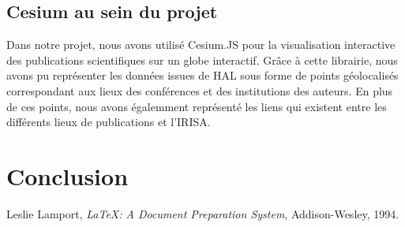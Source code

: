 \documentclass[a4paper,12pt]{article}
\begin{document}
\subsection{Cesium au sein du projet}
Dans notre projet, nous avons utilisé Cesium.JS pour la visualisation interactive des publications scientifiques sur un globe interactif. Grâce à cette librairie, nous avons pu représenter les données issues de HAL sous forme de points géolocalisés 
correspondant aux lieux des conférences et des institutions des auteurs. En plus de ces points, nous avons égalemment représenté les liens qui existent entre les différents lieux de publications et l'IRISA.


\section{Conclusion}


\newpage
\begin{thebibliography}{9}
     Leslie Lamport, \textit{LaTeX: A Document Preparation System}, Addison-Wesley, 1994.
\end{thebibliography}
\end{document}

